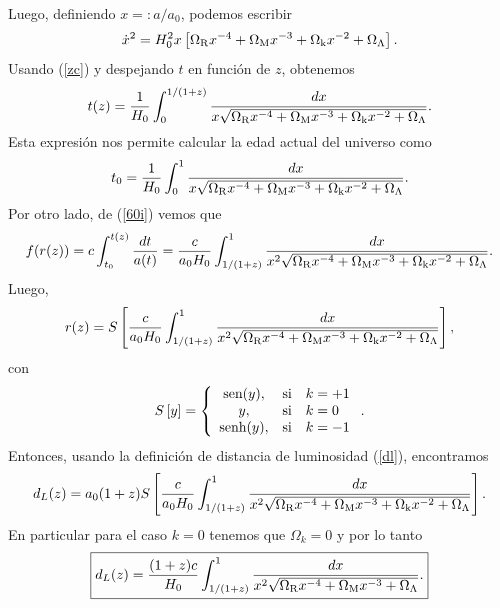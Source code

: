 Luego, definiendo $x=:a/a_0$, podemos escribir 
\begin{equation}
\dot x^2 =H_0^2 x \left[\Omega_{\rm{R}}x^{-4} + \Omega_{\rm{M}}x^{-3}  +\Omega_{\rm{k}}x^{-2} + \Omega_{\rm{\Lambda}}\right].
\end{equation}
Usando (\ref{zc}) y despejando $t$ en función de $z$, obtenemos
\begin{equation}
t(z)=\frac{1}{H_0}\int_0^{1/(1+z)}\frac{dx}{x\sqrt{\Omega_{\rm{R}}x^{-4} + \Omega_{\rm{M}}x^{-3}+\Omega_{\rm{k}}x^{-2} + \Omega_{\rm{\Lambda}} }}.
\end{equation}
Esta expresión nos permite calcular la edad actual del universo como
\begin{equation}
t_0=\frac{1}{H_0}\int_0^1\frac{dx}{x\sqrt{\Omega_{\rm{R}}x^{-4} + \Omega_{\rm{M}}x^{-3}+\Omega_{\rm{k}}x^{-2} + \Omega_{\rm{\Lambda}} }}. \label{tiempo}
\end{equation}
Por otro lado, de (\ref{60i}) vemos que
\begin{equation}
f(r(z))=c\int_{t_0}^{t(z)}\frac{dt}{a(t)}= \frac{c}{a_0H_0}\int_{1/(1+z)}^1\frac{dx}{x^2\sqrt{\Omega_{\rm{R}}x^{-4} + \Omega_{\rm{M}}x^{-3}+\Omega_{\rm{k}}x^{-2} + \Omega_{\rm{\Lambda}} }}.
\end{equation}
Luego,
\begin{equation}
r(z)=S\left[\frac{c}{a_0H_0}\int_{1/(1+z)}^1\frac{dx}{x^2\sqrt{\Omega_{\rm{R}}x^{-4} + \Omega_{\rm{M}}x^{-3}+\Omega_{\rm{k}}x^{-2} + \Omega_{\rm{\Lambda}} }}\right],
\end{equation}
con
\begin{equation}
S\left[y\right]=\left\{
\begin{array}
[c]{ccl}%
\text{sen}(y), &\text{si}& k=+1\\
y, &\text{si}& k=0\\
\text{senh}(y), &\text{si}& k=-1
\end{array}
\right. . \label{61i2}%
\end{equation}
Entonces, usando la definición de distancia de luminosidad (\ref{dl}), encontramos
\begin{equation}
d_L(z)=a_0(1+z)S\left[\frac{c}{a_0H_0}\int_{1/(1+z)}^1\frac{dx}{x^2\sqrt{\Omega_{\rm{R}}x^{-4} + \Omega_{\rm{M}}x^{-3} +\Omega_{\rm{k}}x^{-2} + \Omega_{\rm{\Lambda}}}}\right]. \label{dlzk}
\end{equation}
En particular para el caso $k=0$ tenemos que $\Omega_k=0$ y por lo tanto
\begin{equation}
\boxed{d_L(z)=\frac{(1+z)c}{H_0}\int_{1/(1+z)}^1\frac{dx}{x^2\sqrt{\Omega_{\rm{R}}x^{-4} + \Omega_{\rm{M}}x^{-3} + \Omega_{\rm{\Lambda}}}}.} \label{dlz}
\end{equation}



